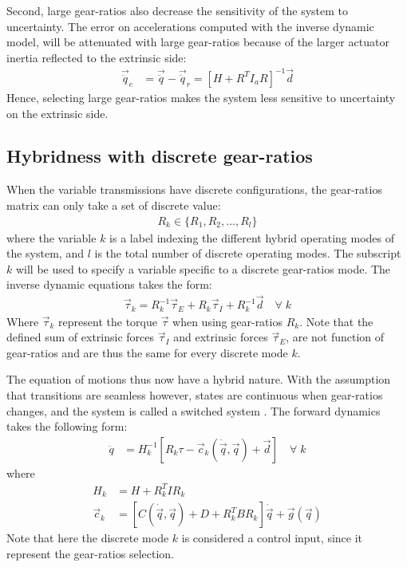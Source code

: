 Second, large gear-ratios also decrease the sensitivity of the system to uncertainty. The error on accelerations computed with the inverse dynamic model, will be attenuated with large gear-ratios because of the larger actuator inertia reflected to the extrinsic side:
\begin{align}
	\vec{\ddot{q}}_e &= \vec{\ddot{q}} - \vec{\ddot{q}}_r = 
	\left[ 
    H + R^T I_a R
	\right]^{-1}
    \vec{d}
 \label{eq:sens}
\end{align}
%
Hence, selecting large gear-ratios makes the system less sensitive to uncertainty on the extrinsic side.

\subsection{Hybridness with discrete gear-ratios}
\label{sec:hyb}

When the variable transmissions have discrete configurations, the gear-ratios matrix can only take a set of discrete value:
%
\begin{align}
	R_k \in \{R_1,R_2, ... , R_l\} 
\end{align}
%
where the variable $k$ is a label indexing the different hybrid operating modes of the system, and $l$ is the total number of discrete operating modes. The subscript $k$ will be used to specify a variable specific to a discrete gear-ratios mode. The inverse dynamic equations takes the form:
%
\begin{align}
	\vec{\tau}_k =  R_k^{-1} \vec{\tau}_E + R_k \vec{\tau}_I + R_k^{-1} \vec{d} \quad\forall \; k
\end{align}
%
Where $\vec{\tau}_k$ represent the torque $\vec{\tau}$ when using gear-ratios $R_k$. Note that the defined sum of extrinsic forces $\vec{\tau}_I$ and extrinsic forces $\vec{\tau}_E$, are not function of gear-ratios and are thus the same for every discrete mode $k$. 

The equation of motions thus now have a hybrid nature. With the assumption that transitions are seamless however, states are continuous when gear-ratios changes, and the system is called a switched system \cite{liberzon_switching_2003}. The forward dynamics takes the following form:
%
\begin{align}
	\ddot{q}  &=  H_k^{-1} \left[ R_k \tau - \vec{c}_k( \dot{\vec{q}} , \vec{q} ) + \vec{d} \right] \quad\forall \; k 
\end{align}
%
where 
%
\begin{align}
	H_k       &=  H + R_k^T I R_k \\
	\vec{c}_k &=  \left[ C(\dot{\vec{q}} , \vec{q}) + D + R_k^T B R_k  \right] \dot{\vec{q}} + \vec{g}( \vec{q} ) 
\end{align}
%
Note that here the discrete mode $k$ is considered a control input, since it represent the gear-ratios selection.

